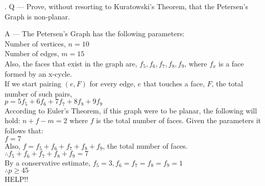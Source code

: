 \documentclass{article}
\newcounter{question}
\begin{document}
\newcommand\Que[1]{%
   \leavevmode\par
   \stepcounter{question}
   \noindent
   \thequestion. Q --- #1\par}

\newcommand\Ans[2][]{%
    \leavevmode\par\noindent
   {\leftskip37pt
    A --- \textbf{#1}#2\par}}

\Que{  
  Prove, without resorting to Kuratowski's Theorem,
  that the Petersen's Graph is non-planar.
  }
\Ans{
  The Petersen's Graph has the following parameters:\\

  Number of vertices, $n=10$\\
  
  Number of edges, $m=15$\\

  Also, the faces that exist in the graph are,
  $f_5,f_6,f_7,f_8,f_9$, where $f_x$ is a face formed by an x-cycle.\\

  If we start pairing $(e,F)$ for every edge, $e$ that touches a face, $F$,
  the total number of such pairs,\\

  $p=5f_5+6f_6+7f_7+8f_8+9f_9$\\

  According to Euler's Theorem, if this graph were to be planar,
  the following will hold: $n+f-m=2$ 
  where $f$ is the total number of faces. Given the parameters
  it follows that:\\

  $f=7$\\

  Also, $f=f_5+f_6+f_7+f_8+f_9$, the total number of faces.\\

  $\therefore f_5+f_6+f_7+f_8+f_9=7$\\
  
  By a conservative estimate, $ f_5=3, f_6=f_7=f_8=f_9=1 $\\

  $\therefore p \ge 45$\\

  HELP!!
  }
\end{document}
